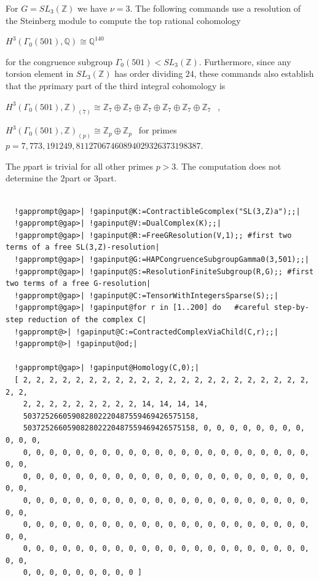 \documentclass[a4paper,11pt]{report}
\begin{document}
{{{\begin{Verbatim}[commandchars=!@|,fontsize=\small,frame=single,label=Example]
\end{Verbatim}
 For $G=SL_3(\mathbb Z)$ we have $\nu = 3$. The following commands use a resolution of the Steinberg module to compute
the top rational cohomology 

$H^3(\Gamma_0(501),\mathbb Q) \cong \mathbb Q^{140}$ 

 for the congruence subgroup $\Gamma_0(501) < SL_3(\mathbb Z)$. Furthermore, since any torsion element in $SL_3(\mathbb Z)$ has order dividing $24$, these commands also establish that the $p$\texttt{}primary part of the third integral cohomology is 

$H^3(\Gamma_0(501),\mathbb Z)_{(7)} \cong \mathbb Z_7 \oplus \mathbb Z_7 \oplus
\mathbb Z_7 \oplus \mathbb Z_7 \oplus \mathbb Z_7 \oplus \mathbb Z_7 \ \ $ , 

$H^3(\Gamma_0(501),\mathbb Z)_{(p)} \cong \mathbb Z_p \oplus \mathbb Z_p \ \ $ for primes $p=7, 773, 191249, 81127067460894029326373198387$. 

The $p$\texttt{}part is trivial for all other primes $p > 3$. The computation does not determine the $2$\texttt{}part or $3$\texttt{}part. 
\begin{Verbatim}[commandchars=!@|,fontsize=\small,frame=single,label=Example]
          
  !gapprompt@gap>| !gapinput@K:=ContractibleGcomplex("SL(3,Z)a");;|
  !gapprompt@gap>| !gapinput@V:=DualComplex(K);;|
  !gapprompt@gap>| !gapinput@R:=FreeGResolution(V,1);; #first two terms of a free SL(3,Z)-resolution|
  !gapprompt@gap>| !gapinput@G:=HAPCongruenceSubgroupGamma0(3,501);;|
  !gapprompt@gap>| !gapinput@S:=ResolutionFiniteSubgroup(R,G);; #first two terms of a free G-resolution|
  !gapprompt@gap>| !gapinput@C:=TensorWithIntegersSparse(S);;|
  !gapprompt@gap>| !gapinput@for r in [1..200] do   #careful step-by-step reduction of the complex C|
  !gapprompt@>| !gapinput@C:=ContractedComplexViaChild(C,r);;|
  !gapprompt@>| !gapinput@od;|
  
  !gapprompt@gap>| !gapinput@Homology(C,0);|
  [ 2, 2, 2, 2, 2, 2, 2, 2, 2, 2, 2, 2, 2, 2, 2, 2, 2, 2, 2, 2, 2, 2, 2, 2, 
    2, 2, 2, 2, 2, 2, 2, 2, 2, 14, 14, 14, 14, 
    503725266059082802220487559469426575158, 
    503725266059082802220487559469426575158, 0, 0, 0, 0, 0, 0, 0, 0, 0, 0, 0, 
    0, 0, 0, 0, 0, 0, 0, 0, 0, 0, 0, 0, 0, 0, 0, 0, 0, 0, 0, 0, 0, 0, 0, 0, 
    0, 0, 0, 0, 0, 0, 0, 0, 0, 0, 0, 0, 0, 0, 0, 0, 0, 0, 0, 0, 0, 0, 0, 0, 
    0, 0, 0, 0, 0, 0, 0, 0, 0, 0, 0, 0, 0, 0, 0, 0, 0, 0, 0, 0, 0, 0, 0, 0, 
    0, 0, 0, 0, 0, 0, 0, 0, 0, 0, 0, 0, 0, 0, 0, 0, 0, 0, 0, 0, 0, 0, 0, 0, 
    0, 0, 0, 0, 0, 0, 0, 0, 0, 0, 0, 0, 0, 0, 0, 0, 0, 0, 0, 0, 0, 0, 0, 0, 
    0, 0, 0, 0, 0, 0, 0, 0, 0 ]
  

\end{Verbatim}}}}
\end{document}
